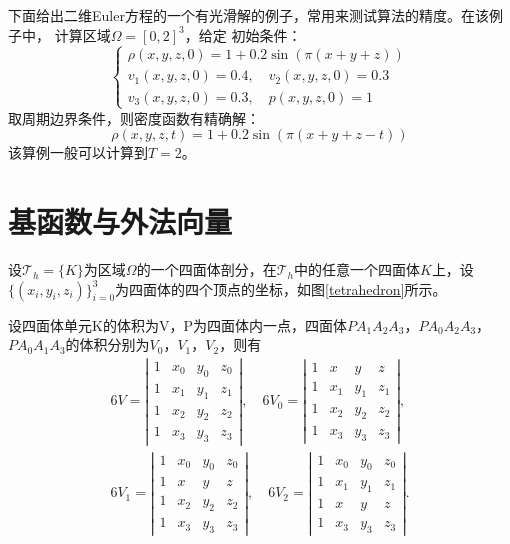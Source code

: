 \documentclass[a4paper, 12pt, UTF8]{ctexart}
\begin{document}
下面给出二维Euler方程的一个有光滑解的例子，常用来测试算法的精度。在该例子中， 计算区域$\Omega=[0,2]^3$，给定 
初始条件： 
\begin{equation}
\begin{cases}
	   \rho(x, y, z, 0)=1+0.2 \sin (\pi(x+y+z)) \\
	   v_{1}(x, y, z, 0)=0.4, \quad v_{2}(x, y, z, 0)=0.3  \\
	   v_{3}(x, y, z, 0)=0.3, \quad p(x, y, z, 0)=1 
    \end{cases}
\end{equation}
取周期边界条件，则密度函数有精确解：
$$\rho(x, y, z, t)=1+0.2 \sin (\pi(x+y+z-t)) $$
该算例一般可以计算到$T = 2$。




\section{基函数与外法向量}
设$\mathcal T_h=\{K\}$为区域$\Omega$的一个四面体剖分，在$\mathcal T_h$中的任意一个四面体$K$上，设$\{(x_i,y_i,z_i)\}_{i=0}^3$为四面体的四个顶点的坐标，如图\ref{tetrahedron}所示。

设四面体单元K的体积为V，P为四面体内一点，四面体$PA_{1}A_{2}A_{3}$，$PA_{0}A_{2}A_{3}$，$PA_{0}A_{1}A_{3}$的体积分别为$V_{0}$，$V_{1}$，$V_{2}$，则有
\begin{equation}
\begin{split}
6 V=\left|\begin{array}{cccc}
1 & x_{0} & y_{0} & z_{0} \\
1 & x_{1} & y_{1} & z_{1} \\
1 & x_{2} & y_{2} & z_{2} \\
1 & x_{3} & y_{3} & z_{3}
\end{array}\right| , \quad
6 V_{0}=\left|\begin{array}{cccc}
1 & x & y & z \\
1 & x_{1} & y_{1} & z_{1} \\
1 & x_{2} & y_{2} & z_{2} \\
1 & x_{3} & y_{3} & z_{3}
\end{array}\right| , \\
6 V_{1}=\left|\begin{array}{cccc}
1 & x_{0} & y_{0} & z_{0} \\
1 & x & y & z \\
1 & x_{2} & y_{2} & z_{2} \\
1 & x_{3} & y_{3} & z_{3}
\end{array}\right| ,  \quad
6 V_{2}=\left|\begin{array}{cccc}
1 & x_{0} & y_{0} & z_{0} \\
1 & x_{1} & y_{1} & z_{1} \\
1 & x & y & z \\
1 & x_{3} & y_{3} & z_{3} 
\end{array}\right| .
\end{split}
\end{equation}
\end{document}
